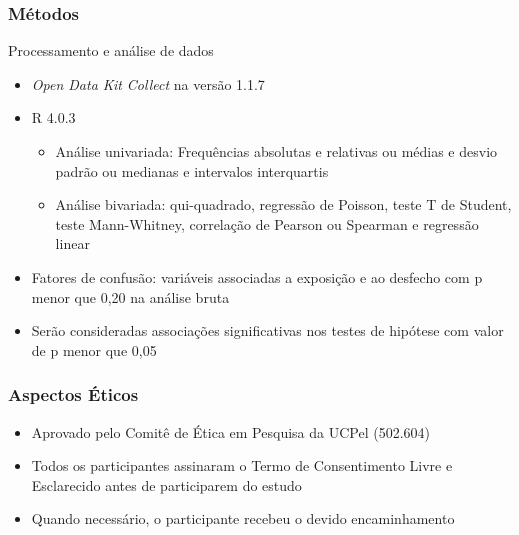 \documentclass{beamer}
\begin{document}
\begin{frame}
\frametitle{Métodos}

    \begin{block}{Processamento e análise de dados}
        \begin{itemize}
            \item \emph{Open Data Kit Collect} na versão 1.1.7       
            \item R 4.0.3
            \begin{itemize}
                \item Análise univariada: Frequências absolutas e relativas ou
                médias e desvio padrão ou medianas e intervalos interquartis
                \item Análise bivariada: qui-quadrado, regressão de Poisson,
                teste T de Student, teste Mann-Whitney, correlação de Pearson
                ou Spearman e regressão linear
            \end{itemize}
            \item Fatores de confusão: variáveis associadas a exposição e ao
            desfecho com p menor que 0,20 na análise bruta
            \item Serão consideradas associações significativas nos testes de
            hipótese com valor de p menor que 0,05
        \end{itemize}
    \end{block}

\end{frame}

\begin{frame}
\frametitle{Aspectos Éticos}

    \Large
    \begin{itemize}

        \item Aprovado pelo Comitê de Ética em Pesquisa da UCPel (502.604)

        \item Todos os participantes assinaram o Termo de Consentimento Livre
        e Esclarecido antes de participarem do estudo

        \item Quando necessário, o participante recebeu o devido encaminhamento

    \end{itemize}

\end{frame}
\end{document}
